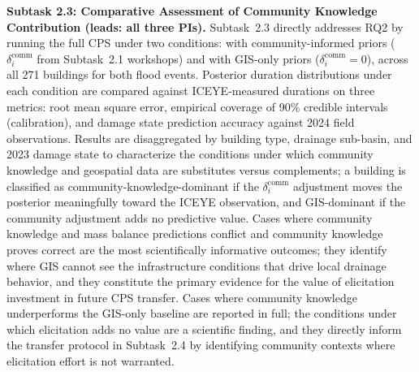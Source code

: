 \documentclass[11pt]{article}
\begin{document}
\textbf{Subtask 2.3: Comparative Assessment of Community Knowledge Contribution
(leads: all three PIs).}
Subtask~2.3 directly addresses RQ2 by running the full CPS under two conditions:
with community-informed priors ($\delta_i^{\mathrm{comm}}$ from Subtask~2.1
workshops) and with GIS-only priors ($\delta_i^{\mathrm{comm}} = 0$), across
all 271 buildings for both flood events.
Posterior duration distributions under each condition are compared against
ICEYE-measured durations on three metrics: root mean square error, empirical
coverage of 90\% credible intervals (calibration), and damage state prediction
accuracy against 2024 field observations.
Results are disaggregated by building type, drainage sub-basin, and 2023 damage
state to characterize the conditions under which community knowledge and geospatial
data are substitutes versus complements; a building is classified as
community-knowledge-dominant if the $\delta_i^{\mathrm{comm}}$ adjustment moves
the posterior meaningfully toward the ICEYE observation, and GIS-dominant if the
community adjustment adds no predictive value.
Cases where community knowledge and mass balance predictions conflict and community
knowledge proves correct are the most scientifically informative outcomes; they
identify where GIS cannot see the infrastructure conditions that drive local
drainage behavior, and they constitute the primary evidence for the value of
elicitation investment in future CPS transfer.
Cases where community knowledge underperforms the GIS-only baseline are reported
in full; the conditions under which elicitation adds no value are a scientific
finding, and they directly inform the transfer protocol in Subtask~2.4 by
identifying community contexts where elicitation effort is not warranted.
\end{document}
